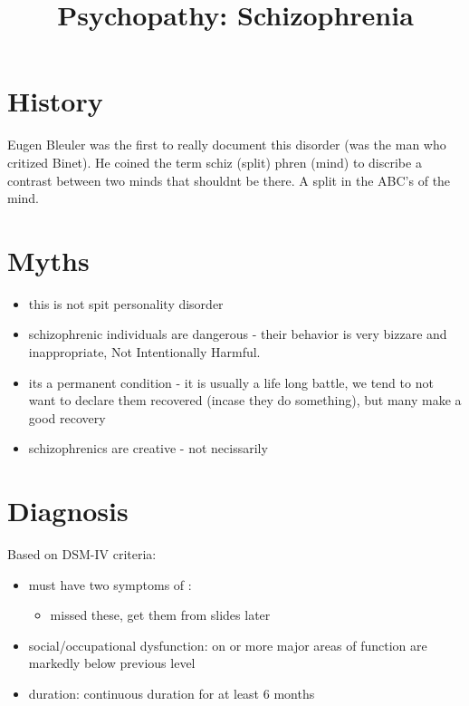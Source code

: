 \documentclass[12pt]{article}
\title{Psychopathy: Schizophrenia}
\begin{document}
\section*{History}
Eugen Bleuler was the first to really document this disorder (was the man who critized Binet). He coined the term schiz (split) phren (mind) to discribe a contrast between two minds that shouldnt be there. A split in the ABC's of the mind.
\section*{Myths}
\begin{itemize}
\item this is not spit personality disorder
\item schizophrenic individuals are dangerous - their behavior is very bizzare and inappropriate, Not Intentionally Harmful. 
\item its a permanent condition - it is usually a life long battle, we tend to not want to declare them recovered (incase they do something), but many make a good recovery
\item schizophrenics are creative - not necissarily
\end{itemize}
\section*{Diagnosis}
Based on DSM-IV criteria:
\begin{itemize}
\item must have two  symptoms of :
\begin{itemize}
\item missed these, get them from slides later
\end{itemize}
\item social/occupational dysfunction: on or more major areas of function are markedly below previous level
\item duration: continuous duration for at least 6 months
\end{itemize}
\end{document}
